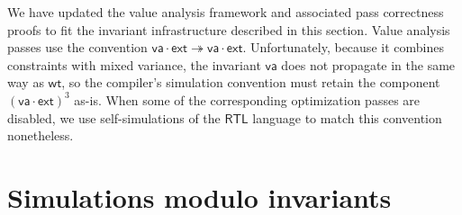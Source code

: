 \documentclass[draft,11pt]{report}
\newcommand{\kw}[1]{\ensuremath{ \mathsf{#1} }}
\begin{document}
We have updated the value analysis framework
and associated pass correctness proofs
to fit the invariant infrastructure described in this section.
Value analysis passes use the convention
$\kw{va} \cdot \kw{ext} \twoheadrightarrow \kw{va} \cdot \kw{ext}$.
Unfortunately,
because it combines constraints with mixed variance,
the invariant $\kw{va}$ does not propagate in the same way as $\kw{wt}$,
so the compiler's simulation convention must retain
the component $(\kw{va} \cdot \kw{ext})^3$ as-is.
When some of the corresponding optimization passes are disabled,
we use self-simulations of the $\kw{RTL}$ language
to match this convention nonetheless.


\section{Simulations modulo invariants} \label{sec:fsim-inv} %
\end{document}
